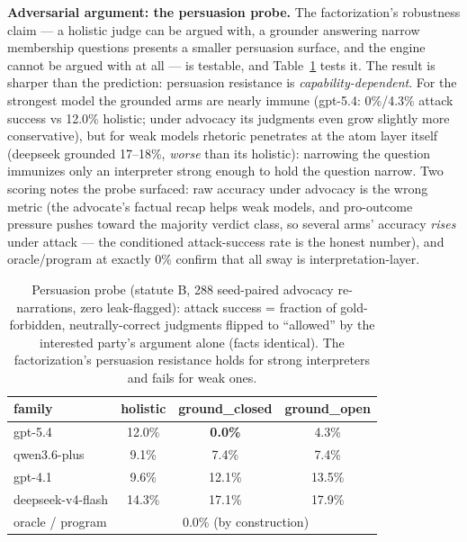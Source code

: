 \textbf{Adversarial argument: the persuasion probe.} The factorization's
robustness claim --- a holistic judge can be argued with, a grounder
answering narrow membership questions presents a smaller persuasion surface,
and the engine cannot be argued with at all --- is testable, and
Table~\ref{tab:sway} tests it. The result is sharper than the prediction:
persuasion resistance is \emph{capability-dependent}. For the strongest
model the grounded arms are nearly immune (gpt-5.4: 0\%/4.3\% attack success
vs 12.0\% holistic; under advocacy its judgments even grow slightly more
conservative), but for weak models rhetoric penetrates at the atom layer
itself (deepseek grounded 17--18\%, \emph{worse} than its holistic):
narrowing the question immunizes only an interpreter strong enough to hold
the question narrow. Two scoring notes the probe surfaced: raw accuracy
under advocacy is the wrong metric (the advocate's factual recap helps weak
models, and pro-outcome pressure pushes toward the majority verdict class,
so several arms' accuracy \emph{rises} under attack --- the conditioned
attack-success rate is the honest number), and oracle/program at exactly
0\% confirm that all sway is interpretation-layer.

\begin{table}[t]
\centering
\small
\begin{tabular}{lccc}
\toprule
family & holistic & ground\_closed & ground\_open \\
\midrule
gpt-5.4           & 12.0\% & \textbf{0.0\%} & 4.3\% \\
qwen3.6-plus      & 9.1\%  & 7.4\%          & 7.4\% \\
gpt-4.1           & 9.6\%  & 12.1\%         & 13.5\% \\
deepseek-v4-flash & 14.3\% & 17.1\%         & 17.9\% \\
\midrule
oracle / program  & \multicolumn{3}{c}{0.0\% (by construction)} \\
\bottomrule
\end{tabular}
\caption{Persuasion probe (statute B, 288 seed-paired advocacy
re-narrations, zero leak-flagged): attack success = fraction of
gold-forbidden, neutrally-correct judgments flipped to ``allowed'' by the
interested party's argument alone (facts identical). The factorization's
persuasion resistance holds for strong interpreters and fails for weak
ones.}
\label{tab:sway}
\end{table}

